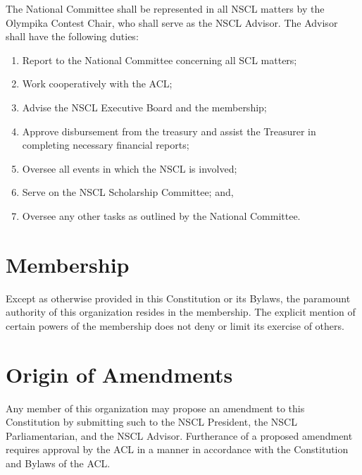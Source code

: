 \documentclass{bylaws}
\newcommand{\NSCL}{\textsc{NSCL}\xspace}
\newcommand{\SCL}{\textsc{SCL}\xspace}
\newcommand{\ACL}{\textsc{ACL}\xspace}
\begin{document}
\begin{linenumbers}[1]
\begin{enumerate}
    \sub[\NSCL Advisor] The National Committee shall be represented in
    all \NSCL matters by the Olympika Contest Chair, who shall serve as
    the \NSCL Advisor. The Advisor shall have the following duties:
    \begin{enumerate}
    \item Report to the National Committee concerning all \SCL matters;
    \item Work cooperatively with the \ACL;
    \item Advise the \NSCL Executive Board and the membership;
    \item Approve disbursement from the treasury and assist the
      Treasurer in completing necessary financial reports;
    \item Oversee all events in which the \NSCL is involved;
    \item Serve on the \NSCL Scholarship Committee; and,
    \item Oversee any other tasks as outlined by the National Committee.\\
    \end{enumerate}
  \end{enumerate}

  \section{Membership}
  Except as otherwise provided in this Constitution or its Bylaws, the
  paramount authority of this organization resides in the
  membership. The explicit mention of certain powers of the membership
  does not deny or limit its exercise of others.\\


  \section{Origin of Amendments}
  Any member of this organization may propose an amendment to this
  Constitution by submitting such to the \NSCL President, the \NSCL
  Parliamentarian, and the \NSCL Advisor. Furtherance of a proposed
  amendment requires approval by the \ACL in a manner in accordance with
  the Constitution and Bylaws of the \ACL.\\


\end{linenumbers}
\end{document}
